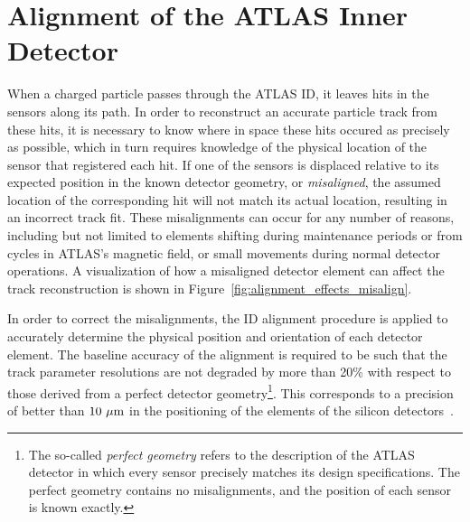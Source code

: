 \chapter[Alignment of the ATLAS Inner Detector][Alignment of the ATLAS Inner Detector]{Alignment of the ATLAS Inner Detector}
\label{ch:alignment}

When a charged particle passes through the ATLAS ID, it leaves hits in the sensors along its path.
In order to reconstruct an accurate particle track from these hits, it is necessary to know where in space these hits occured as precisely as possible, which in turn requires knowledge of the physical location of the sensor that registered each hit.
If one of the sensors is displaced relative to its expected position in the known detector geometry, or \emph{misaligned}, the assumed location of the corresponding hit will not match its actual location, resulting in an incorrect track fit.
These misalignments can occur for any number of reasons, including but not limited to elements shifting during maintenance periods or from cycles in ATLAS's magnetic field, or small movements during normal detector operations.
A visualization of how a misaligned detector element can affect the track reconstruction is shown in Figure~\ref{fig:alignment_effects_misalign}. %

In order to correct the misalignments, the ID alignment procedure is applied to accurately determine the physical position and orientation of each detector element.
The baseline accuracy of the alignment is required to be such that the track parameter resolutions are not degraded by more than 20\% with respect to those derived from a perfect detector geometry\footnote{The so-called \emph{perfect geometry} refers to the description of the ATLAS detector in which every sensor precisely matches its design specifications.  The perfect geometry contains no misalignments, and the position of each sensor is known exactly.}.
This corresponds to a precision of better than $10~\mu\textrm{m}$ in the positioning of the elements of the silicon detectors~\cite{TDR-ID1}.

